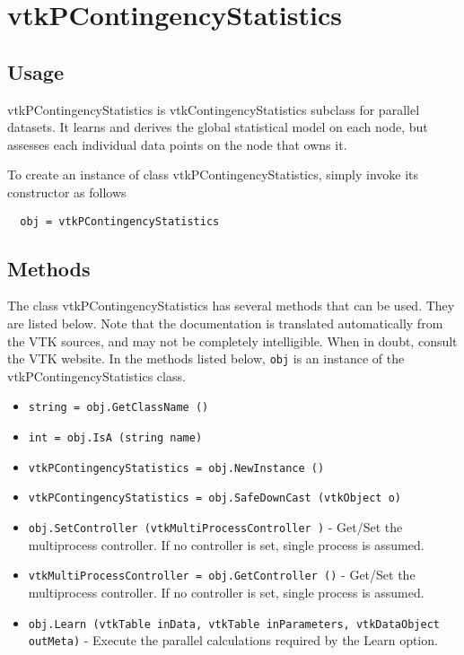 \section{vtkPContingencyStatistics}

\subsection{Usage}

 vtkPContingencyStatistics is vtkContingencyStatistics subclass for parallel datasets.
 It learns and derives the global statistical model on each node, but assesses each 
 individual data points on the node that owns it.

To create an instance of class vtkPContingencyStatistics, simply
invoke its constructor as follows
\begin{verbatim}
  obj = vtkPContingencyStatistics
\end{verbatim}
\subsection{Methods}

The class vtkPContingencyStatistics has several methods that can be used.
  They are listed below.
Note that the documentation is translated automatically from the VTK sources,
and may not be completely intelligible.  When in doubt, consult the VTK website.
In the methods listed below, \verb|obj| is an instance of the vtkPContingencyStatistics class.
\begin{itemize}
\item  \verb|string = obj.GetClassName ()|

\item  \verb|int = obj.IsA (string name)|

\item  \verb|vtkPContingencyStatistics = obj.NewInstance ()|

\item  \verb|vtkPContingencyStatistics = obj.SafeDownCast (vtkObject o)|

\item  \verb|obj.SetController (vtkMultiProcessController )| -  Get/Set the multiprocess controller. If no controller is set,
 single process is assumed.

\item  \verb|vtkMultiProcessController = obj.GetController ()| -  Get/Set the multiprocess controller. If no controller is set,
 single process is assumed.

\item  \verb|obj.Learn (vtkTable inData, vtkTable inParameters, vtkDataObject outMeta)| -  Execute the parallel calculations required by the Learn option.

\end{itemize}
